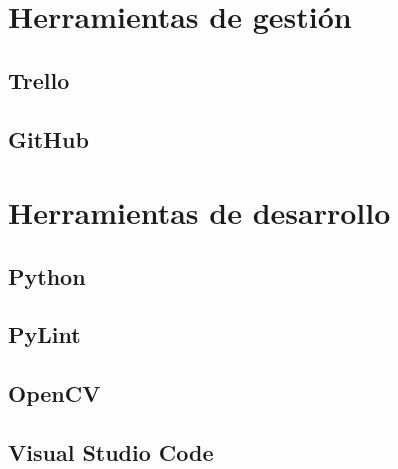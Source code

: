 \section{Herramientas de gestión}

\subsection{Trello}

\subsection{GitHub}

\section{Herramientas de desarrollo}

\subsection{Python}

\subsection{PyLint}

\subsection{OpenCV}

\subsection{Visual Studio Code}




 
